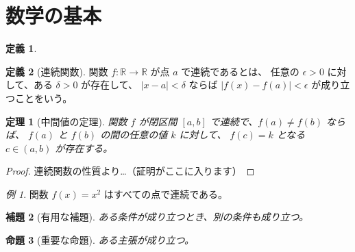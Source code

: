 \documentclass{article}
\theoremstyle{definition} %
\newtheorem{definition}{定義}[section] %
\theoremstyle{plain} %
\newtheorem{theorem}{定理}[section]   %
\newtheorem{lemma}[theorem]{補題}     %
\newtheorem{proposition}[theorem]{命題} %
\theoremstyle{remark} %
\newtheorem{example}{例}[section]     %
\begin{document}
\section{数学の基本}
\begin{definition}
\end{definition}

\begin{definition}[連続関数]
関数 $f: \mathbb{R} \to \mathbb{R}$ が点 $a$ で連続であるとは、
任意の $\epsilon > 0$ に対して、ある $\delta > 0$ が存在して、
$|x - a| < \delta$ ならば $|f(x) - f(a)| < \epsilon$ が成り立つことをいう。
\end{definition}

\begin{theorem}[中間値の定理]
関数 $f$ が閉区間 $[a, b]$ で連続で、$f(a) \neq f(b)$ ならば、
$f(a)$ と $f(b)$ の間の任意の値 $k$ に対して、
$f(c) = k$ となる $c \in (a, b)$ が存在する。
\end{theorem}

\begin{proof}
連続関数の性質より…（証明がここに入ります）
\end{proof}

\begin{example}
関数 $f(x) = x^2$ はすべての点で連続である。
\end{example}

\begin{lemma}[有用な補題]
ある条件が成り立つとき、別の条件も成り立つ。
\end{lemma}

\begin{proposition}[重要な命題]
ある主張が成り立つ。
\end{proposition}
\end{document}
